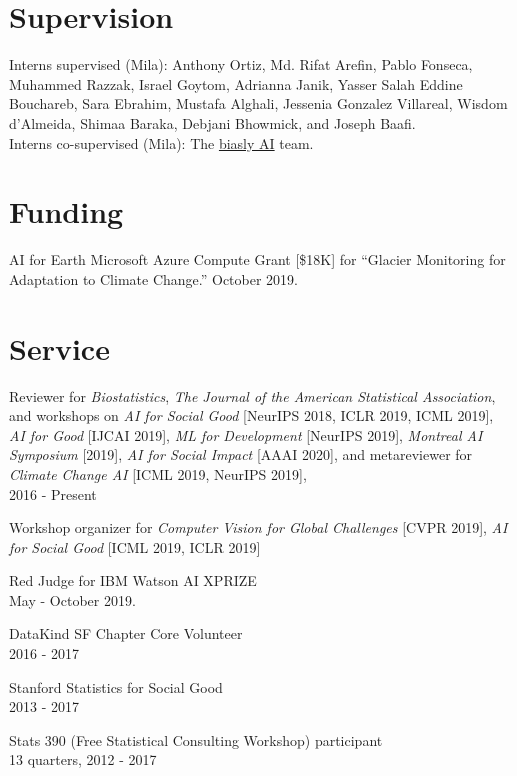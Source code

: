 \documentclass[letterpaper]{article}
\renewenvironment{itemize}{
  \begin{list}{}{
    \setlength{\leftmargin}{1.5em}
  }
}{
  \end{list}
}
\begin{document}
\section*{Supervision}
Interns supervised (Mila): Anthony Ortiz, Md. Rifat Arefin, Pablo Fonseca, Muhammed Razzak, Israel Goytom, Adrianna Janik, Yasser Salah Eddine Bouchareb, Sara Ebrahim, Mustafa Alghali, Jessenia Gonzalez Villareal, Wisdom d'Almeida, Shimaa Baraka, Debjani Bhowmick, and Joseph Baafi. \\
Interns co-supervised (Mila): The \href{https://sites.google.com/view/biaslyai/home}{biasly AI} team.

\section*{Funding}
AI for Earth Microsoft Azure Compute Grant [\$18K] for
``Glacier Monitoring for Adaptation to Climate Change.'' October 2019.

\section*{Service}

\begin{itemize}
\item Reviewer for \textit{Biostatistics}, \textit{The Journal of the American Statistical Association}, and workshops on \textit{AI for Social Good} [NeurIPS 2018, ICLR 2019, ICML 2019], \textit{AI for Good} [IJCAI 2019], \textit{ML for Development} [NeurIPS 2019], \textit{Montreal AI Symposium} [2019], \textit{AI for Social Impact} [AAAI 2020], and metareviewer for \textit{Climate Change AI} [ICML 2019, NeurIPS 2019],\\
  2016 - Present
\item Workshop organizer for \textit{Computer Vision for Global Challenges} [CVPR 2019], \textit{AI for Social Good} [ICML 2019, ICLR 2019]
\item Red Judge for IBM Watson AI XPRIZE \\
May - October 2019.
\item DataKind SF Chapter Core Volunteer \\
  2016 - 2017
\item Stanford Statistics for Social Good \\
  2013 - 2017
\item Stats 390 (Free Statistical Consulting Workshop) participant \\
  13 quarters, 2012 - 2017
\end{itemize}
\end{document}
